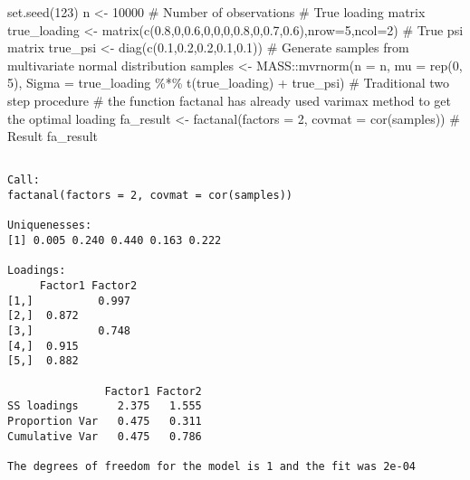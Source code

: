 \documentclass[
  a4paper,
  oneside,
  openany,
  12pt,
  onecolumn,
  twoside]{book}
\newenvironment{Shaded}{\begin{snugshade}}{\end{snugshade}}
\newcommand{\AttributeTok}[1]{\textcolor[rgb]{0.40,0.45,0.13}{#1}}
\newcommand{\CommentTok}[1]{\textcolor[rgb]{0.37,0.37,0.37}{#1}}
\newcommand{\DecValTok}[1]{\textcolor[rgb]{0.68,0.00,0.00}{#1}}
\newcommand{\FloatTok}[1]{\textcolor[rgb]{0.68,0.00,0.00}{#1}}
\newcommand{\FunctionTok}[1]{\textcolor[rgb]{0.28,0.35,0.67}{#1}}
\newcommand{\NormalTok}[1]{\textcolor[rgb]{0.00,0.23,0.31}{#1}}
\newcommand{\OtherTok}[1]{\textcolor[rgb]{0.00,0.23,0.31}{#1}}
\newcommand{\SpecialCharTok}[1]{\textcolor[rgb]{0.37,0.37,0.37}{#1}}
\theoremstyle{plain}
\theoremstyle{remark}
\begin{document}
\begin{Shaded}
\begin{Highlighting}[]
\FunctionTok{set.seed}\NormalTok{(}\DecValTok{123}\NormalTok{)}
\NormalTok{n }\OtherTok{\textless{}{-}} \DecValTok{10000} \CommentTok{\# Number of observations}
\CommentTok{\# True loading matrix}
\NormalTok{true\_loading }\OtherTok{\textless{}{-}} \FunctionTok{matrix}\NormalTok{(}\FunctionTok{c}\NormalTok{(}\FloatTok{0.8}\NormalTok{,}\DecValTok{0}\NormalTok{,}\FloatTok{0.6}\NormalTok{,}\DecValTok{0}\NormalTok{,}\DecValTok{0}\NormalTok{,}\DecValTok{0}\NormalTok{,}\FloatTok{0.8}\NormalTok{,}\DecValTok{0}\NormalTok{,}\FloatTok{0.7}\NormalTok{,}\FloatTok{0.6}\NormalTok{),}\AttributeTok{nrow=}\DecValTok{5}\NormalTok{,}\AttributeTok{ncol=}\DecValTok{2}\NormalTok{) }
\CommentTok{\# True psi matrix}
\NormalTok{true\_psi }\OtherTok{\textless{}{-}} \FunctionTok{diag}\NormalTok{(}\FunctionTok{c}\NormalTok{(}\FloatTok{0.1}\NormalTok{,}\FloatTok{0.2}\NormalTok{,}\FloatTok{0.2}\NormalTok{,}\FloatTok{0.1}\NormalTok{,}\FloatTok{0.1}\NormalTok{))}
\CommentTok{\# Generate samples from multivariate normal distribution}
\NormalTok{samples }\OtherTok{\textless{}{-}}\NormalTok{ MASS}\SpecialCharTok{::}\FunctionTok{mvrnorm}\NormalTok{(}\AttributeTok{n =}\NormalTok{ n, }\AttributeTok{mu =} \FunctionTok{rep}\NormalTok{(}\DecValTok{0}\NormalTok{, }\DecValTok{5}\NormalTok{), }
                         \AttributeTok{Sigma =}\NormalTok{ true\_loading }\SpecialCharTok{\%*\%} \FunctionTok{t}\NormalTok{(true\_loading) }\SpecialCharTok{+}\NormalTok{ true\_psi)}
\CommentTok{\# Traditional two step procedure}
\CommentTok{\# the function factanal has already used varimax method to get the optimal loading}
\NormalTok{fa\_result }\OtherTok{\textless{}{-}} \FunctionTok{factanal}\NormalTok{(}\AttributeTok{factors =} \DecValTok{2}\NormalTok{, }\AttributeTok{covmat =} \FunctionTok{cor}\NormalTok{(samples))}
\CommentTok{\# Result}
\NormalTok{fa\_result}
\end{Highlighting}
\end{Shaded}

\begin{verbatim}

Call:
factanal(factors = 2, covmat = cor(samples))

Uniquenesses:
[1] 0.005 0.240 0.440 0.163 0.222

Loadings:
     Factor1 Factor2
[1,]          0.997 
[2,]  0.872         
[3,]          0.748 
[4,]  0.915         
[5,]  0.882         

               Factor1 Factor2
SS loadings      2.375   1.555
Proportion Var   0.475   0.311
Cumulative Var   0.475   0.786

The degrees of freedom for the model is 1 and the fit was 2e-04 
\end{verbatim}
\end{document}
